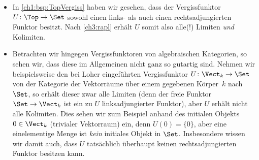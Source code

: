 \begin{thBeispiel}\hfill
    \begin{itemize}
        \item
            In \cref{ch1:bsp:TopVergiss} haben wir gesehen, dass der Vergissfunktor
            $U\colon\Top\to\Set$ sowohl einen links- als auch einen rechtsadjungierten
            Funktor besitzt. Nach \cref{ch3:rapl} erhält $U$ somit also alle(!) Limiten
            \emph{und} Kolimiten.
            
        \item
            Betrachten wir hingegen Vergissfunktoren von algebraischen Kategorien, so
            sehen wir, dass diese im Allgemeinen nicht ganz so gutartig sind. Nehmen wir
            beispielsweise den bei Loher\cite[1.3]{talk:loher} eingeführten
            Vergissfunktor $U\colon \Vect_k\to\Set$ von der Kategorie der Vektorräume
            über einem gegebenen Körper~$k$ nach $\Set$, so erhält dieser zwar alle
            Limiten (denn der freie Funktor $\Set\to\Vect_k$ ist ein zu $U$
            linksadjungierter Funktor), aber $U$ erhält nicht alle Kolimiten. Dies sehen
            wir zum Beispiel anhand des initialen Objekts $0\in\Vect_k$ (trivialer
            Vektorraum) ein, denn $U(0) = \{0\}$, aber eine einelementige Menge ist
            \emph{kein} initiales Objekt in $\Set$. Insbesondere wissen wir damit auch,
            dass $U$ tatsächlich überhaupt keinen rechtsadjungierten Funktor
            besitzen kann. 
    \end{itemize}
\end{thBeispiel}

